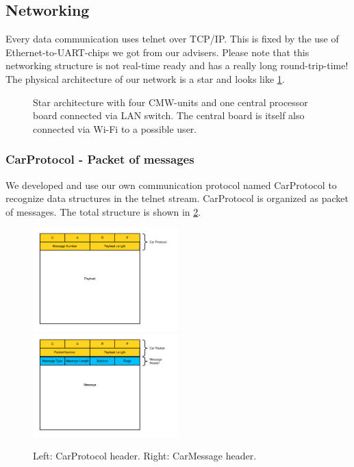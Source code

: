 \subsection{Networking}

Every data communication uses telnet over TCP/IP. This is fixed by the use of Ethernet-to-UART-chips we got from our advisers. Please note that this networking structure is not real-time ready and has a really long round-trip-time!\\

The physical architecture of our network is a star and looks like \ref{star}.

\begin{figure}[h] 
	\caption{Star architecture with four CMW-units and one central processor board connected via LAN switch. The central board is itself also connected via Wi-Fi to a possible user.} \label{star}
\end{figure}

\subsubsection{CarProtocol - Packet of messages}

We developed and use our own communication protocol named CarProtocol to recognize data structures in the telnet stream. CarProtocol is organized as packet of messages. The total structure is shown in \ref{CarProtocol}.

\begin{figure}[ht]
	\includegraphics[width=0.5\textwidth]{figures/prot0.pdf}
	\includegraphics[width=0.5\textwidth]{figures/prot1.pdf}
	\caption{Left: CarProtocol header. Right: CarMessage header.} \label{CarProtocol}
\end{figure}

